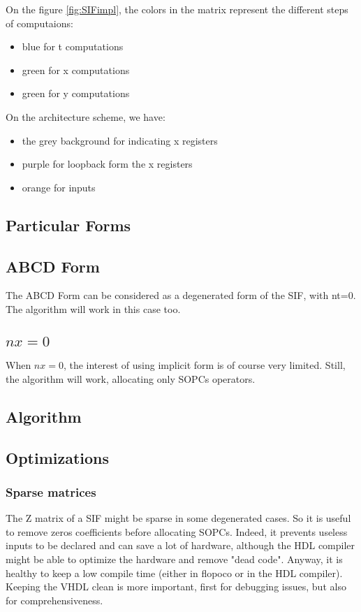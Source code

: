 	On the figure \ref{fig:SIFimpl}, the colors in the matrix represent the different steps of computaions:
	\begin{itemize}
		\item blue for t computations
		\item green for x computations
		\item green for y computations
	\end{itemize}

	On the architecture scheme, we have:
	\begin{itemize}
		\item the grey background for indicating x registers
		\item purple for loopback form the x registers
		\item orange for inputs
	\end{itemize}
	

\subsection{Particular Forms}
	\subsection{ABCD Form}
	The ABCD Form can be considered as a degenerated form of the SIF, with nt=0.
	The algorithm will work in this case too.
	\subsection{$nx=0$}
	When $nx=0$, the interest of using implicit form is of course very limited.
	Still, the algorithm will work, allocating only SOPCs operators.
	
\subsection{Algorithm}

\subsection{Optimizations}
	\subsubsection{Sparse matrices}
		The Z matrix of a SIF might be sparse in some degenerated cases.
		So it is useful to remove zeros coefficients before allocating SOPCs.
		Indeed, it prevents useless inputs to be declared and can save a lot of hardware,
		although the HDL compiler might be able to optimize the hardware and remove "dead code".
		Anyway, it is healthy to keep a low compile time (either in flopoco or in the HDL compiler).
		Keeping the VHDL clean is more important, first for debugging issues, but also for comprehensiveness.
